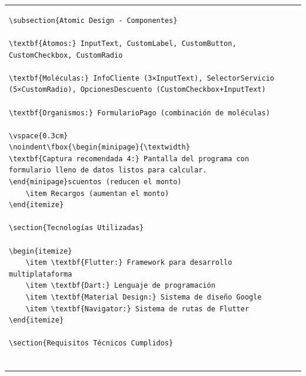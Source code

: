 \documentclass[11pt,a4paper]{article}
\begin{document}
\begin{table}[H]
\begin{tabular}{|l|c|l|}
\begin{lstlisting}[basicstyle=\ttfamily\tiny]
\subsection{Atomic Design - Componentes}

\textbf{Átomos:} InputText, CustomLabel, CustomButton, CustomCheckbox, CustomRadio

\textbf{Moléculas:} InfoCliente (3×InputText), SelectorServicio (5×CustomRadio), OpcionesDescuento (CustomCheckbox+InputText)

\textbf{Organismos:} FormularioPago (combinación de moléculas)

\vspace{0.3cm}
\noindent\fbox{\begin{minipage}{\textwidth}
\textbf{Captura recomendada 4:} Pantalla del programa con formulario lleno de datos listos para calcular.
\end{minipage}scuentos (reducen el monto)
    \item Recargos (aumentan el monto)
\end{itemize}

\section{Tecnologías Utilizadas}

\begin{itemize}
    \item \textbf{Flutter:} Framework para desarrollo multiplataforma
    \item \textbf{Dart:} Lenguaje de programación
    \item \textbf{Material Design:} Sistema de diseño Google
    \item \textbf{Navigator:} Sistema de rutas de Flutter
\end{itemize}

\section{Requisitos Técnicos Cumplidos}


\end{lstlisting}
\end{tabular}
\end{table}
\end{document}
